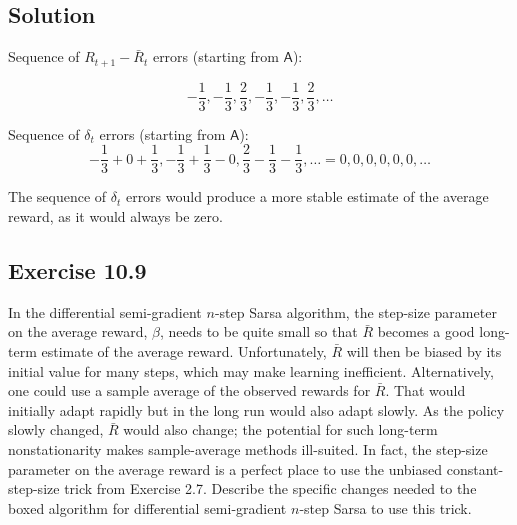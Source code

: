 \subsection*{Solution}

Sequence of $R_{t+1} - \bar{R}_t$ errors (starting from $\mathsf{A}$):

\[
    - \frac{1}{3}, - \frac{1}{3}, \frac{2}{3}, - \frac{1}{3}, - \frac{1}{3}, \frac{2}{3}, \dots
\]

Sequence of $\delta_t$ errors (starting from $\mathsf{A}$):
\[
    - \frac{1}{3} + 0 + \frac{1}{3}, - \frac{1}{3} + \frac{1}{3} - 0, \frac{2}{3} - \frac{1}{3} - \frac{1}{3}, \dots = 0,0,0,0,0,0, \dots
\]

The sequence of $\delta_t$ errors would produce a more stable estimate of the average reward, as it would always be zero.

\subsection*{Exercise 10.9}

In the differential semi-gradient $n$-step Sarsa algorithm, the step-size
parameter on the average reward, $\beta$, needs to be quite small so that $\bar{R}$ becomes a good
long-term estimate of the average reward. Unfortunately, $\bar{R}$ will then be biased by its
initial value for many steps, which may make learning inefficient. Alternatively, one could
use a sample average of the observed rewards for $\bar{R}$. That would initially adapt rapidly
but in the long run would also adapt slowly. As the policy slowly changed, $\bar{R}$ would also
change; the potential for such long-term nonstationarity makes sample-average methods
ill-suited. In fact, the step-size parameter on the average reward is a perfect place to use
the unbiased constant-step-size trick from Exercise 2.7. Describe the specific changes
needed to the boxed algorithm for differential semi-gradient $n$-step Sarsa to use this
trick.

